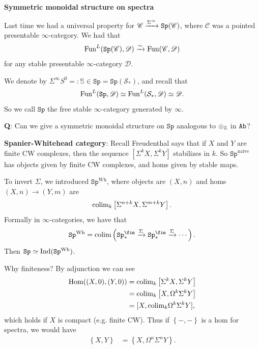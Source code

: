 \documentclass[12pt]{amsart}
\theoremstyle{definition}
\providecommand{\Sp}{\texttt{Sp}}
\providecommand{\Sp}{\text{Sp}}
\begin{document}
\begin{center}
    \textbf{Symmetric monoidal structure on spectra}
\end{center}

Last time we had a universal property for $\mathscr{C} \xto{\Sigma^\infty} \Sp(\mathscr{C})$, where $\mathscr{C}$ was a pointed presentable $\infty$-category. We had that
\begin{align*}
    \Fun^L(\Sp(\mathscr{C}),\mathscr{D}) \xto{\sim} \Fun(\mathscr{C},\mathscr{D})
\end{align*}
for any stable presentable $\infty$-category $\mathscr{D}$.

We denote by $\Sigma^\infty S^0 =: \mathbb{S}\in \Sp = \Sp(\mathcal{S}_\ast)$, and recall that
\begin{align*}
    \Fun^L(\Sp,\mathscr{D}) \simeq \Fun^L(\mathcal{S}_\ast,\mathscr{D}) \simeq \mathscr{D}.
\end{align*}
So we call $\Sp$ the free stable $\infty$-category generated by $\infty$.

\textbf{Q}: Can we give a symmetric monoidal structure on $\Sp$ analogous to $\otimes_{\mathbb{Z}}$ in $\texttt{Ab}$?

\textbf{Spanier-Whitehead category}: Recall Freudenthal says that if $X$ and $Y$ are finite CW complexes, then the sequence $[\Sigma^k X, \Sigma^k Y]$ stabilizes in $k$. So $\Sp^\text{naive}$ has objects given by finite CW complexes, and homs given by stable maps.

To invert $\Sigma$, we introduced $\Sp^\text{Wh}$, where objects are $(X,n)$ and homs $(X,n) \to (Y,m)$ are
\begin{align*}
    \text{colim}_k \left[ \Sigma^{n+k} X, \Sigma^{m+k} Y \right].
\end{align*}
Formally in $\infty$-categories, we have that
\begin{align*}
    \Sp^\text{Wh} = \colim \left( \Sp_\ast^\fin \xto{\Sigma} \Sp_\ast^\fin \xto{\Sigma} \cdots \right).
\end{align*}
Then $\Sp \simeq \Ind(\Sp^\text{Wh})$.

Why finiteness? By adjunction we can see
\begin{align*}
    \text{Hom}((X,0), (Y,0)) &= \text{colim}_k \left[ \Sigma^{k} X, \Sigma^{k} Y \right] \\
    &= \text{colim}_k \left[ X, \Omega^k \Sigma^k Y \right] \\
    &= [X, \text{colim}_k \Omega^k \Sigma^k Y],
\end{align*}
which holds if $X$ is compact (e.g. finite CW). Thus if $\left\{ -,- \right\}$ is a hom for spectra, we would have
\begin{align*}
    \left\{ X,Y \right\} &= \left\{ X, \Omega^n \Sigma^n Y \right\}.
\end{align*}
\end{document}
